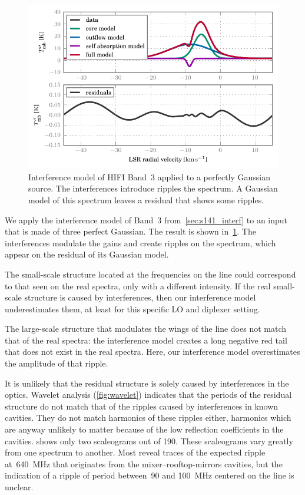 \begin{figure}[b!]
    \centering
    \includegraphics{87_00_00_interf}
    \caption{
        Interference model of HIFI Band~3 applied to a perfectly Gaussian source.
        The interferences introduce ripples the spectrum.
        A Gaussian model of this spectrum leaves a residual that shows some ripples.
    }
    \label{fig:87_00_00_interf}
\end{figure}

We apply the interference model of Band~3 from~\cref{sec:s141_interf} to an input that is made of three perfect Gaussian.
The result is shown in~\cref{fig:87_00_00_interf}.
The interferences modulate the gains and create ripples on the spectrum, which appear on the residual of its Gaussian model.


The small-scale structure located at the frequencies on the line could correspond to that seen on the real spectra, only with a different intensity.
If the real small-scale structure is caused by interferences, then our interference model underestimates them, at least for this specific LO and diplexer setting.

The large-scale structure that modulates the wings of the line does not match that of the real spectra: the interference model creates a long negative red tail that does not exist in the real spectra.
Here, our interference model overestimates the amplitude of that ripple.

It is unlikely that the residual structure is solely caused by interferences in the optics.
Wavelet analysis (\cref{fig:wavelet}) indicates that the periods of the residual structure do not match that of the ripples caused by interferences in known cavities.
They do not match harmonics of these ripples either, harmonics which are anyway unlikely to matter because of the low reflection coefficients in the cavities.
 shows only two scaleograms out of 190.
These scaleograms vary greatly from one spectrum to another.
Most reveal traces of the expected ripple at~\SI{640}{\mega\hertz} that originates from the mixer--rooftop-mirrors cavities, but the indication of a ripple of period between~\num{90} and \SI{100}{\mega\hertz} centered on the line is unclear.

